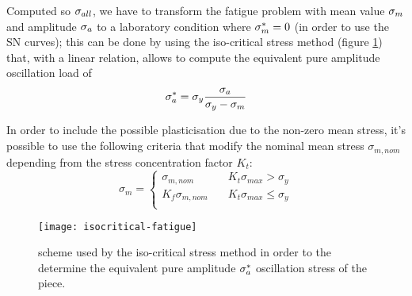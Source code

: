 	Computed so $\sigma_{all}$, we have to transform the fatigue problem with mean value $\sigma_{m}$ and amplitude $\sigma_{a}$ to a laboratory condition where $\sigma_{m}^* = 0$ (in order to use the SN curves); this can be done by using the iso-critical stress method (figure \ref{fig:isocritical}) that, with a linear relation, allows to compute the equivalent pure amplitude oscillation load of 
	\begin{equation}
		\sigma_{a}^* = \sigma_y \frac{\sigma_{a}}{\sigma_y - \sigma_{m}}
	\end{equation}

	In order to include the possible plasticisation due to the non-zero mean stress, it's possible to use the following criteria that modify the nominal mean stress $\sigma_{m,nom}$ depending from the stress concentration factor $K_t$:
	\begin{equation} \label{eq:plasticization}
		\sigma_m = \begin{cases}
			\sigma_{m,nom} & K_t \sigma_{max} > \sigma_y \\
			K_f\sigma_{m,nom} \quad & K_t \sigma_{max} \leq \sigma_y \\
		\end{cases}
	\end{equation}
	
	\begin{SCfigure}[2][bht]
		\centering \texttt{[image: isocritical-fatigue]}
		\caption{scheme used by the iso-critical stress method in order to the determine the equivalent pure amplitude $\sigma_{a}^*$ oscillation stress of the piece.} \label{fig:isocritical}
	\end{SCfigure}

